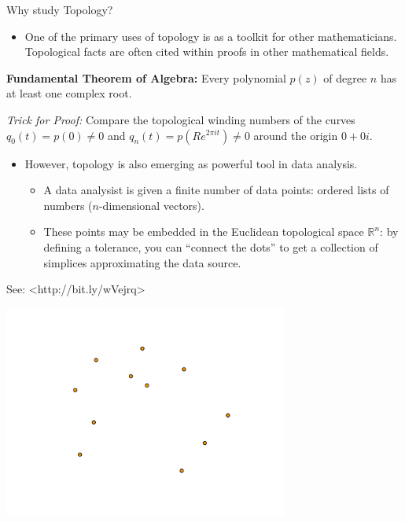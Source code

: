 \documentclass{beamer}
\begin{document}
\begin{frame}{Why study Topology?}
  \begin{itemize}
    \item 
      One of the primary uses of topology is as a toolkit for other mathematicians. Topological facts are often cited within proofs in other mathematical fields.
  \end{itemize}
  \textbf{Fundamental Theorem of Algebra:} Every polynomial $p(z)$ of degree $n$ has at least one complex root.

  \textit{Trick for Proof:} Compare the topological winding numbers of the curves $q_0(t) = p(0) \not= 0$ and $q_n(t) = p(Re^{2\pi i t}) \not= 0$ around the origin $0+0i$.
\end{frame}
\begin{frame}
  \begin{itemize}
    \item
      However, topology is also emerging as powerful tool in data analysis.
      \begin{itemize}
        \item A data analysist is given a finite number of data points: ordered lists of numbers ($n$-dimensional vectors).
        \item These points may be embedded in the Euclidean topological space $\mathbb{R}^n$: by defining a tolerance, you can ``connect the dots'' to get a collection of simplices approximating the data source.
      \end{itemize}
  \end{itemize}
  {\tiny See: <http://bit.ly/wVejrq>}
\end{frame}
\begin{frame}
  \begin{center}
    \includegraphics[height=7cm]{images/data_nosource}
  \end{center}
\end{frame}
\end{document}
